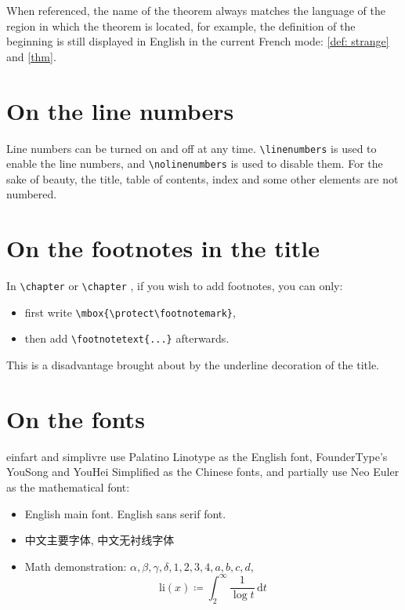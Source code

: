 \documentclass{simplivre}
\providecommand{\einfart}{\textsf{einfart}}
\providecommand{\simplivre}{\textsf{simplivre}}
\begin{document}
When referenced, the name of the theorem always matches the language of the region in which the theorem is located, for example, the definition of the beginning is still displayed in English in the current French mode: \cref{def: strange} and \cref{thm}. 


\section{On the line numbers}
Line numbers can be turned on and off at any time. \lstinline|\linenumbers| is used to enable the line numbers, and \lstinline|\nolinenumbers| is used to disable them. For the sake of beauty, the title, table of contents, index and some other elements are not numbered.

\section{On the footnotes in the title}
In \lstinline|\chapter| or \lstinline|\chapter| , if you wish to add footnotes, you can only:
\begin{itemize}
    \item first write \lstinline|\mbox{\protect\footnotemark}|, 
    \item then add \lstinline|\footnotetext{...}| afterwards. 
\end{itemize}
This is a disadvantage brought about by the underline decoration of the title.

\section{On the fonts}
\einfart{} and \simplivre{} use Palatino Linotype as the English font, FounderType's YouSong and YouHei Simplified as the Chinese fonts, and partially use Neo Euler as the mathematical font:
\begin{itemize}
    \item English main font. \textsf{English sans serif font}.
    \item 中文主要字体, \textsf{中文无衬线字体}
    \item Math demonstration: \( \alpha, \beta, \gamma, \delta, 1,2,3,4, a,b,c,d \), \[\mathrm{li}(x)\coloneqq \int_2^{\infty} \frac{1}{\log t}\,\mathrm{d}t \]
\end{itemize}
\end{document}
